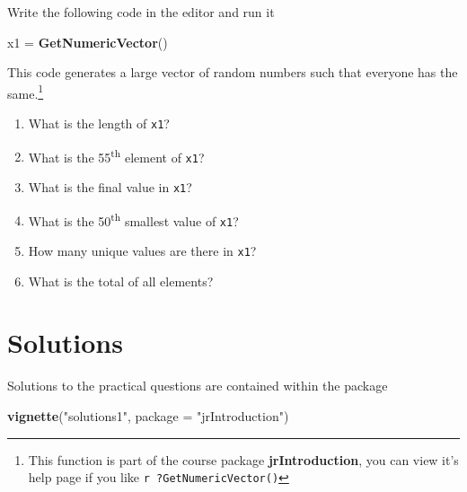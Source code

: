 \documentclass[]{tufte-handout}
\newenvironment{Shaded}{}{}
\newcommand{\DataTypeTok}[1]{\textcolor[rgb]{0.56,0.13,0.00}{#1}}
\newcommand{\KeywordTok}[1]{\textcolor[rgb]{0.00,0.44,0.13}{\textbf{#1}}}
\newcommand{\NormalTok}[1]{#1}
\newcommand{\StringTok}[1]{\textcolor[rgb]{0.25,0.44,0.63}{#1}}
\begin{document}
Write the following code in the editor and run it

\begin{Shaded}
\begin{Highlighting}[]
\NormalTok{x1 =}\StringTok{ }\KeywordTok{GetNumericVector}\NormalTok{()}
\end{Highlighting}
\end{Shaded}

\noindent This code generates a large vector of random numbers such that
everyone has the same.\footnote{This function is part of the course
  package \textbf{jrIntroduction}, you can view it's help page if you
  like \texttt{r\ ?GetNumericVector()}}

\begin{enumerate}
\def\labelenumi{\arabic{enumi}.}
\item
  What is the length of \texttt{x1}?
\item
  What is the 55\textsuperscript{th} element of \texttt{x1}?
\item
  What is the final value in \texttt{x1}?
\item
  What is the 50\textsuperscript{th} smallest value of \texttt{x1}?
\item
  How many unique values are there in \texttt{x1}?
\item
  What is the total of all elements?
\end{enumerate}

\hypertarget{solutions}{%
\section{Solutions}\label{solutions}}

Solutions to the practical questions are contained within the package

\begin{Shaded}
\begin{Highlighting}[]
\KeywordTok{vignette}\NormalTok{(}\StringTok{"solutions1"}\NormalTok{, }\DataTypeTok{package =} \StringTok{"jrIntroduction"}\NormalTok{)}
\end{Highlighting}
\end{Shaded}
\end{document}
